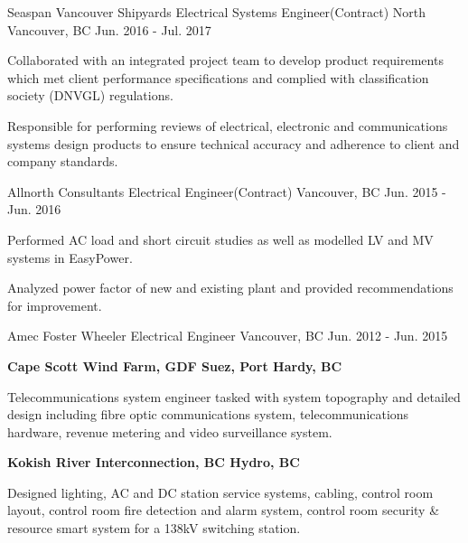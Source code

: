 \begin{cventries}
    \cventry
    {Seaspan Vancouver Shipyards} %
    {Electrical Systems Engineer(Contract)} %
    {North Vancouver, BC} %
    {Jun. 2016 - Jul. 2017} %
    { %
        \begin{cvitems}
            \item {Collaborated with an integrated project team to develop product requirements which met client performance specifications and complied with classification society (DNVGL) regulations.}
            \item {Responsible for performing reviews of electrical, electronic and communications systems design products to ensure technical accuracy and adherence to client and company standards.}
        \end{cvitems}
    }

    \cventry
    {Allnorth Consultants} %
    {Electrical Engineer(Contract)} %
    {Vancouver, BC} %
    {Jun. 2015 - Jun. 2016} %
    { %
        \begin{cvitems}
            \item {Performed AC load and short circuit studies as well as modelled LV and MV systems in EasyPower.}
            \item{Analyzed power factor of new and existing plant and provided recommendations for improvement.}
        \end{cvitems}
    }

    \cventry
    {Amec Foster Wheeler} %
    {Electrical Engineer} %
    {Vancouver, BC} %
    {Jun. 2012 - Jun. 2015} %
    { %
        \begin{cvitems}
            \item[]\textbf{Cape Scott Wind Farm, GDF Suez, Port Hardy, BC}
            \item {Telecommunications system engineer tasked with system topography and detailed design including fibre optic communications system, telecommunications hardware, revenue metering and video surveillance system.}
            \item[]\textbf{Kokish River Interconnection, BC Hydro, BC}
            \item{Designed lighting, AC and DC station service systems, cabling, control room layout, control room fire detection and alarm system, control room security \& resource smart system for a 138kV switching station.}
        \end{cvitems}
    }
\end{cventries}